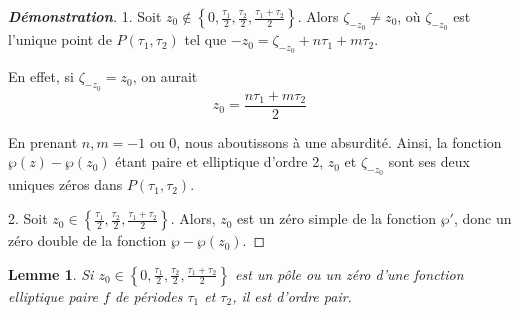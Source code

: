 \documentclass[12pt]{article}
\newtheorem{lemma}{Lemme}
\begin{document}
                    \begin{proof}[\textbf{Démonstration}] 
                    1. Soit \(z_0 \notin \left\{ 0, \frac{\tau_1}{2}, \frac{\tau_2}{2}, \frac{\tau_1 + \tau_2}{2} \right\}\). Alors \(\zeta_{- z_0} \neq z_0\), où \(\zeta_{- z_0}\) est l'unique point de \(P(\tau_1, \tau_2)\) tel que \(-z_0 = \zeta_{- z_0} + n\tau_1 + m\tau_2\).
                    
                    En effet, si $\zeta_{- z_0} = z_0$, on aurait
                    \[
                    z_0 = \frac{n\tau_1 + m\tau_2}{2}
                    \]                    
                    
                    En prenant \(n, m = - 1\) ou 0, nous aboutissons à une absurdité. Ainsi, la fonction \(\wp(z) - \wp(z_0)\) étant paire et elliptique d'ordre 2, \(z_0\) et $\zeta_{- z_0}$ sont ses deux uniques zéros dans \(P(\tau_1, \tau_2)\).
                    
                    2. Soit \(z_0 \in \left\{ \frac{\tau_1}{2}, \frac{\tau_2}{2}, \frac{\tau_1 + \tau_2}{2} \right\}\). Alors, \(z_0\) est un zéro simple de la fonction \(\wp'\), donc un zéro double de la fonction \(\wp - \wp(z_0)\).
                    \end{proof}
                    
                    \begin{lemma}
                    Si \(z_0 \in \left\{ 0, \frac{\tau_1}{2}, \frac{\tau_2}{2}, \frac{\tau_1 + \tau_2}{2} \right\}\) est un pôle ou un zéro d'une fonction elliptique paire \(f\) de périodes \(\tau_1\) et \(\tau_2\), il est d'ordre pair.
                    \end{lemma}
                    
\end{document}
